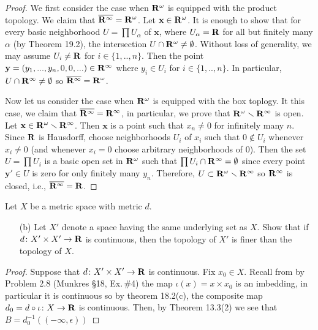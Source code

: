 \begin{proof}
We first consider the case when $\mathbf{R}^\omega$ is equipped with the
product topology. We claim that
$\overline{\mathbf{R}^\infty}=\mathbf{R}^\omega$. Let $\mathbf{x}\in\mathbf{R}^\omega$. It
is enough to show that for every basic neighborhood $U=\prod
U_\alpha$ of $\mathbf{x}$, where $U_\alpha=\mathbf{R}$ for all but
finitely many $\alpha$ (by Theorem 19.2), the intersection
$U\cap\mathbf{R}^\omega \neq\emptyset$. Without loss of generality, we
may assume $U_i\neq\mathbf{R}$ for $i\in\{1,..,n\}$. Then the point
$\mathbf{y}=(y_1,...,y_n,0,0,...)\in \mathbf{R}^\infty$ where
$y_i\in U_i$ for $i\in\{1,..,n\}$. In particular,
$U\cap\mathbf{R}^\infty\neq\emptyset$ so
$\overline{\mathbf{R}^\infty}=\mathbf{R}^\omega$.

Now let us consider the case when $\mathbf{R}^\omega$ is equipped with
the box toplogy. It this case, we claim that
$\overline{\mathbf{R}^\infty}=\mathbf{R}^\infty$, in particular, we prove that
$\mathbf{R}^\omega\smallsetminus\mathbf{R}^\infty$ is open. Let
$\mathbf{x}\in\mathbf{R}^\omega\smallsetminus\mathbf{R}^\infty$. Then $\mathbf{x}$
is a point such that $x_n\neq 0$ for infinitely
many $n$. Since $\mathbf{R}$ is Hausdorff, choose neighborhoods
$U_i$ of $x_i$ such that $0\notin U_i$ whenever
$x_i\neq 0$ (and whenever $x_i=0$ choose arbitrary neighborhoods
of $0$). Then the set $U=\prod U_i$ is a basic open set in
$\mathbf{R}^\omega$ such that $\prod U_i\cap\mathbf{R}^\infty=\emptyset$ since
every point $\mathbf{y}'\in U$ is zero for only finitely
many $y_n$. Therefore, $U\subset\mathbf{R}^\omega\smallsetminus\mathbf{R}^\infty$ so
$\mathbf{R}^\infty$ is closed, i.e., $\overline{\mathbf{R}^\infty}=\mathbf{R}$.
\end{proof}
\newpage
\begin{problem}[Munkres \S20, p.\,126, \#3(b)]
Let $X$ be a metric space with metric $d$.
\begin{enumerate}[noitemsep]
\item[(b)] Let $X'$ denote a space having the same underlying set
  as $X$. Show that if $d\colon X'\times X'\to\mathbf{R}$ is continuous,
  then the topology of $X'$ is finer than the topology of $X$.
\end{enumerate}
\end{problem}
\begin{proof}
Suppose that $d\colon X'\times X'\to\mathbf{R}$ is continuous. Fix
$x_0\in X$. Recall from by Problem 2.8 (Munkres \S18, Ex.\,\#4) the
map $\iota(x)=x\times x_0$ is an imbedding, in particular it is
continuous so by theorem 18.2(c), the composite map
$d_0=d\circ\iota\colon X\to\mathbf{R}$ is continuous. Then, by Theorem
13.3(2) we see that $B=d_0^{-1}((-\infty,\epsilon))$
\end{proof}
